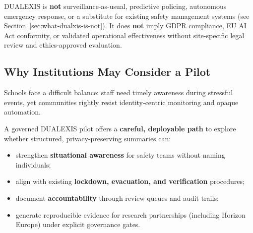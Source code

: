 \begin{center}
\end{center}

DUALEXIS is \textbf{not} surveillance-as-usual, predictive policing, autonomous emergency
response, or a substitute for existing safety management systems (see Section~\ref{sec:what-dualxis-is-not}).
It does \textbf{not} imply GDPR compliance, EU AI Act conformity, or validated operational
effectiveness without site-specific legal review and ethics-approved evaluation.

\subsection{Why Institutions May Consider a Pilot}

Schools face a difficult balance: staff need timely awareness during stressful events,
yet communities rightly resist identity-centric monitoring and opaque automation.

A governed DUALEXIS pilot offers a \textbf{careful, deployable path} to explore whether
structured, privacy-preserving summaries can:

\begin{itemize}[noitemsep]
  \item strengthen \textbf{situational awareness} for safety teams without naming individuals;
  \item align with existing \textbf{lockdown, evacuation, and verification} procedures;
  \item document \textbf{accountability} through review queues and audit trails;
  \item generate reproducible evidence for research partnerships (including Horizon Europe)
        under explicit governance gates.
\end{itemize}

